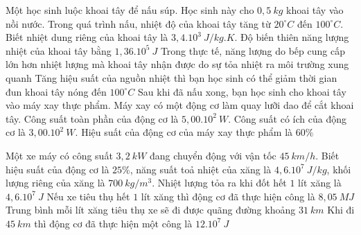 \begin{ex}
Một học sinh luộc khoai tây để nấu súp. Học sinh này cho $0,5\ kg$ khoai tây vào nồi nước. Trong quá trình nấu, nhiệt độ của khoai tây tăng từ $20^{\circ}C$ đến $100^{\circ}C$. Biết nhiệt dung riêng của khoai tây là $3,4.10^{3}\ J/kg.K$.
\choiceTFt
{\True Độ biến thiên năng lượng nhiệt của khoai tây bằng $1,36.10^{5}\ J$}
{\True Trong thực tế, năng lượng do bếp cung cấp lớn hơn nhiệt lượng mà khoai tây nhận được do sự tỏa nhiệt ra môi trường xung quanh}
{\True Tăng hiệu suất của nguồn nhiệt thì bạn học sinh có thể giảm thời gian đun khoai tây nóng đến $100^{\circ}C$}
{\True Sau khi đã nấu xong, bạn học sinh cho khoai tây vào máy xay thực phẩm. Máy xay có một động cơ làm quay lưỡi dao để cắt khoai tây. Công suất toàn phần của động cơ là $5,00.10^{2}\ W$. Công suất có ích của động cơ là $3,00.10^{2}\ W$. Hiệu suất của động cơ của máy xay thực phẩm là $60\%$}
\end{ex}

\begin{ex}
	Một xe máy có công suất $3,2\ kW$ đang chuyển động với vận tốc $45\ km/h$. Biết hiệu suất của động cơ là $25\%$, năng suất toả nhiệt của xăng là $4,6.10^7\ J/kg$, khối lượng riêng của xăng là $700\ kg/m^3$. 
	\choiceTFt
	{Nhiệt lượng tỏa ra khi đốt hết $1$ lít xăng là $4,6. 10^7\ J$}
	{\True Nếu xe tiêu thụ hết $1$ lít xăng thì động cơ đã thực hiện công là $8,05\ MJ$}
	{\True Trung bình mỗi lít xăng tiêu thụ xe sẽ đi được quãng đường khoảng $31\ km$}
	{Khi đi $45\ km$ thì động cơ đã thực hiện một công là $12.10^7\ J$}
\end{ex}

